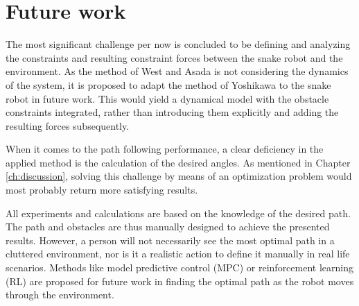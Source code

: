 \section{Future work}

The most significant challenge per now is concluded to be defining and analyzing the constraints and resulting constraint forces between the snake robot and the environment. As the method of West and Asada \cite{west1985method} is not considering the dynamics of the system, it is proposed to adapt the method of Yoshikawa \cite{yoshikawa1987dynamic} to the snake robot in future work. This would yield a dynamical model with the obstacle constraints integrated, rather than introducing them explicitly and adding the resulting forces subsequently.

When it comes to the path following performance, a clear deficiency in the applied method is the calculation of the desired angles. As mentioned in Chapter \ref{ch:discussion}, solving this challenge by means of an optimization problem would most probably return more satisfying results.

All experiments and calculations are based on the knowledge of the desired path. The path and obstacles are thus manually designed to achieve the presented results. However, a person will not necessarily see the most optimal path in a cluttered environment, nor is it a realistic action to define it manually in real life scenarios. 
Methods like model predictive control (MPC) or reinforcement learning (RL) are proposed for future work in finding the optimal path as the robot moves through the environment.

